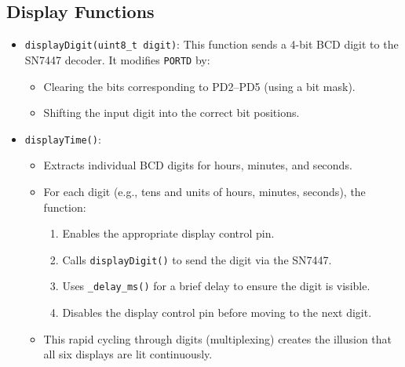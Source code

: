\documentclass{article}
\theoremstyle{remark}
\begin{document}
\subsection{Display Functions}
\begin{itemize}[noitemsep]
    \item \texttt{displayDigit(uint8\_t digit)}:  
    This function sends a 4-bit BCD digit to the SN7447 decoder. It modifies \texttt{PORTD} by:
    \begin{itemize}[noitemsep]
        \item Clearing the bits corresponding to PD2--PD5 (using a bit mask).
        \item Shifting the input digit into the correct bit positions.
    \end{itemize}
    
    \item \texttt{displayTime()}:
    \begin{itemize}[noitemsep]
        \item Extracts individual BCD digits for hours, minutes, and seconds.
        \item For each digit (e.g., tens and units of hours, minutes, seconds), the function:
        \begin{enumerate}[noitemsep]
            \item Enables the appropriate display control pin.
            \item Calls \texttt{displayDigit()} to send the digit via the SN7447.
            \item Uses \texttt{\_delay\_ms()} for a brief delay to ensure the digit is visible.
            \item Disables the display control pin before moving to the next digit.
        \end{enumerate}
        \item This rapid cycling through digits (multiplexing) creates the illusion that all six displays are lit continuously.
    \end{itemize}
\end{itemize}
\end{document}
